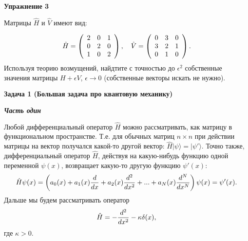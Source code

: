 \documentclass[a4paper,12pt]{article}
\begin{document}
\vspace{15pt}
\noindent \textbf{Упражнение 3}

\noindent Матрицы $\hat{H}$ и $\hat{V}$ имеют вид:

\begin{equation}\notag \hat{H}	=\left(\begin{array}{ccc}
2 & 0 & 1\\
0 & 2 & 0\\
1 & 0 & 2
\end{array}\right),\quad\hat{V}=\left(\begin{array}{ccc}
0 & 3 & 0\\
3 & 2 & 1\\
0 & 1 & 0
\end{array}\right).
\end{equation}
\noindent Используя теорию возмущений, найдтите с точностью до $\epsilon^{2}$ собственные значения матрицы $H+\epsilon V$, $\epsilon\rightarrow 0$ (собственные векторы искать не нужно).

\vspace{15pt}
\noindent \textbf{Задача 1 (Большая задача про квантовую механику)}

\noindent \textbf{\textit{Часть один}}

\noindent Любой дифференциальный оператор $\hat{H}$ можно рассматривать, как матрицу в функциональном пространстве. Т.е. для обычных матриц $n\times n$ при действии матрицы на вектор получался какой-то другой вектор: $\hat{H}|\psi\rangle=|\psi'\rangle$. Точно также, дифференциальный оператор $\hat{H}$, действуя на какую-нибудь функцию одной переменной $\psi(x)$, возвращает какую-то другую функцию $\psi'(x)$: 
\begin{equation}\notag
\hat{H}\psi(x)	=\left(a_{0}(x)+a_{1}(x)\frac{d}{dx}+a_{2}(x)\frac{d^{2}}{dx^{2}}+...+a_{N}(x)\frac{d^{N}}{dx^{N}}\right)\psi(x)=\psi'(x).
\end{equation}
\noindent Дальше мы будем рассматривать оператор
\begin{equation}\notag
\hat{H}	=-\frac{d^{2}}{dx^{2}}-\kappa\delta(x),
\end{equation}
\noindent где $\kappa>0$.
\end{document}
